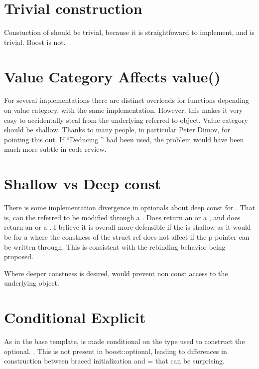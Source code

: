 \documentclass[a4paper,10pt,oneside,openany,final,article]{memoir}
\begin{document}
\section{Trivial construction}
Constuction of  should be trivial, because it is straightfoward to implement, and  is trivial. Boost is not.

\section{Value Category Affects value()}
For several implementations there are distinct overloads for functions depending on value category, with the same implementation. However, this makes it very easy to accidentally steal from the underlying referred to object. Value category should be shallow. Thanks to many people, in particular Peter Dimov, for pointing this out. If ``Deducing '' had been used, the problem would have been much more subtle in code review.

\section{Shallow vs Deep const}

There is some implementation divergence in optionals about deep const for . That is, can the referred to  be modified through a . Does  return an  or a , and does  return an  or a . I believe it is overall more defensible if the  is shallow as it would be for a  where the constness of the struct ref does not affect if the p pointer can be written through. This is consistent with the rebinding behavior being proposed.

Where deeper constness is desired,  would prevent non const access to the underlying object.

\section{Conditional Explicit}
As in the base template,  is made conditional on the type used to construct the optional. . This is not present in boost::optional, leading to differences in construction between braced initialization and = that can be surprising.
\end{document}
